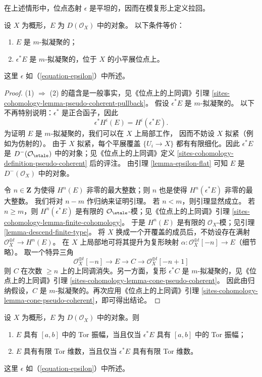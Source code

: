 \noindent
在上述情形中，位点态射 $\epsilon$ 是平坦的，因而在模复形上定义拉回。

\begin{lemma}
\label{lemma-descend-pseudo-coherent}
设 $X$ 为概形，$E$ 为 $D(\mathcal{O}_X)$ 中的对象。
以下条件等价：
\begin{enumerate}
\item $E$ 是 $m$-拟凝聚的；
\item $\epsilon^*E$ 是 $m$-拟凝聚的，位于 $X$ 的小平展位点上。
\end{enumerate}
这里 $\epsilon$ 如（\ref{equation-epsilon}）中所述。
\end{lemma}

\begin{proof}
(1) $\Rightarrow$ (2) 的蕴含是一般事实，见《位点上的上同调》引理
\ref{sites-cohomology-lemma-pseudo-coherent-pullback}。
假设 $\epsilon^*E$ 是 $m$-拟凝聚的。
以下不再特别说明：$\epsilon^*$ 是正合函子，因此
$$
\epsilon^*H^i(E) = H^i(\epsilon^*E).
$$
为证明 $E$ 是 $m$-拟凝聚的，我们可以在 $X$ 上局部工作，
因而不妨设 $X$ 拟紧（例如为仿射的）。
由于 $X$ 拟紧，每个平展覆盖 $\{U_i \to X\}$
都有有限细化。因此 $\epsilon^*E$ 是
$D^{-}(\mathcal{O}_\etale)$ 中的对象；见《位点上的上同调》定义
\ref{sites-cohomology-definition-pseudo-coherent} 后的评注。
由引理 \ref{lemma-epsilon-flat} 可知 $E$ 是
$D^-(\mathcal{O}_X)$ 中的对象。

\medskip\noindent
令 $n \in \mathbf{Z}$ 为使得 $H^n(E)$ 非零的最大整数；则 $n$ 也是使得
$H^n(\epsilon^*E)$ 非零的最大整数。
我们将对 $n - m$ 作归纳来证明引理。
若 $n < m$，则引理显然成立。
若 $n \geq m$，则 $H^n(\epsilon^*E)$ 是有限的
$\mathcal{O}_\etale$-模；见《位点上的上同调》引理
\ref{sites-cohomology-lemma-finite-cohomology}。
于是 $H^n(E)$ 是有限的 $\mathcal{O}_X$-模；见引理
\ref{lemma-descend-finite-type}。
将 $X$ 换成一个开覆盖的成员后，不妨设存在满射
$\mathcal{O}_X^{\oplus t} \to H^n(E)$。
在 $X$ 上局部地可将其提升为复形映射
$\alpha : \mathcal{O}_X^{\oplus t}[-n] \to E$（细节略）。
取一个特异三角
$$
\mathcal{O}_X^{\oplus t}[-n] \to E \to C \to \mathcal{O}_X^{\oplus t}[-n + 1]
$$
则 $C$ 在次数 $\geq n$ 上的上同调消失。另一方面，复形
$\epsilon^*C$ 是 $m$-拟凝聚的，见《位点上的上同调》引理
\ref{sites-cohomology-lemma-cone-pseudo-coherent}。
因此由归纳假设，$C$ 是 $m$-拟凝聚的。再次应用《位点上的上同调》引理
\ref{sites-cohomology-lemma-cone-pseudo-coherent}，即可得出结论。
\end{proof}

\begin{lemma}
\label{lemma-descend-tor-amplitude}
设 $X$ 为概形，$E$ 为 $D(\mathcal{O}_X)$ 中的对象。则
\begin{enumerate}
\item $E$ 具有 $[a, b]$ 中的 Tor 振幅，当且仅当
$\epsilon^*E$ 具有 $[a, b]$ 中的 Tor 振幅；
\item $E$ 具有有限 Tor 维数，当且仅当 $\epsilon^*E$ 具有有限
Tor 维数。
\end{enumerate}
这里 $\epsilon$ 如（\ref{equation-epsilon}）中所述。
\end{lemma}

